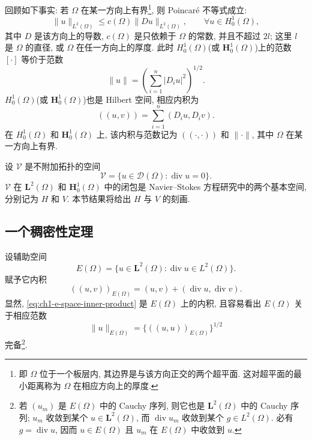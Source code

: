 回顾如下事实: 若 $\Omega$ 在某一方向上有界\footnote{即 $\Omega$ 位于一个板层内, 其边界是与该方向正交的两个超平面. 这对超平面的最小距离称为 $\Omega$ 在相应方向上的厚度.}, 则 Poincaré 不等式成立:
\begin{equation}
\lVert u\rVert_{L^2(\Omega)}\leq c(\Omega)\lVert Du\rVert_{L^2(\Omega)},
\qquad\forall u\in H_0^1(\Omega),
\label{eq:ch1-poincare-inequality}
\end{equation}
其中 $D$ 是该方向上的导数, $c(\Omega)$ 是只依赖于 $\Omega$ 的常数, 并且不超过 $2l$; 这里 $l$ 是 $\Omega$ 的直径, 或 $\Omega$ 在任一方向上的厚度. 此时 $H_0^1(\Omega)$(或 $\mathbf H_0^1(\Omega)$)上的范数 $[\cdot]$ 等价于范数
\begin{equation}
\lVert u\rVert=\left(\sum_{i=1}^n\lvert D_i u\rvert^2\right)^{1/2}.
\label{eq:ch1-h01-gradient-norm}
\end{equation}
$H_0^1(\Omega)$(或 $\mathbf H_0^1(\Omega)$)也是 Hilbert 空间, 相应内积为
\begin{equation}
((u,v))=\sum_{i=1}^n(D_i u,D_i v).
\label{eq:ch1-h01-gradient-inner-product}
\end{equation}
在 $H_0^1(\Omega)$ 和 $\mathbf H_0^1(\Omega)$ 上, 该内积与范数记为 $((\cdot,\cdot))$ 和 $\lVert\cdot\rVert$, 其中 $\Omega$ 在某一方向上有界.

设 $\mathcal V$ 是不附加拓扑的空间
\begin{equation}
\mathcal V=\{u\in\mathbf{\mathcal D}(\Omega):\operatorname{div}u=0\}.
\label{eq:ch1-test-divergence-free-space}
\end{equation}
$\mathcal V$ 在 $\mathbf L^2(\Omega)$ 和 $\mathbf H_0^1(\Omega)$ 中的闭包是 Navier--Stokes 方程研究中的两个基本空间, 分别记为 $H$ 和 $V$. 本节结果将给出 $H$ 与 $V$ 的刻画.

\subsection{一个稠密性定理}
\label{subsec:ch1-density-theorem}

设辅助空间
\[
E(\Omega)=\{u\in\mathbf L^2(\Omega):\operatorname{div}u\in L^2(\Omega)\}.
\]
赋予它内积
\begin{equation}
((u,v))_{E(\Omega)}=(u,v)+(\operatorname{div}u,\operatorname{div}v).
\label{eq:ch1-e-space-inner-product}
\end{equation}
显然, \eqref{eq:ch1-e-space-inner-product} 是 $E(\Omega)$ 上的内积, 且容易看出 $E(\Omega)$ 关于相应范数
\[
\lVert u\rVert_{E(\Omega)}=\{((u,u))_{E(\Omega)}\}^{1/2}
\]
完备\footnote{若 $(u_m)$ 是 $E(\Omega)$ 中的 Cauchy 序列, 则它也是 $\mathbf L^2(\Omega)$ 中的 Cauchy 序列; $u_m$ 收敛到某个 $u\in\mathbf L^2(\Omega)$, 而 $\operatorname{div}u_m$ 收敛到某个 $g\in L^2(\Omega)$. 必有 $g=\operatorname{div}u$, 因而 $u\in E(\Omega)$ 且 $u_m$ 在 $E(\Omega)$ 中收敛到 $u$.}.

